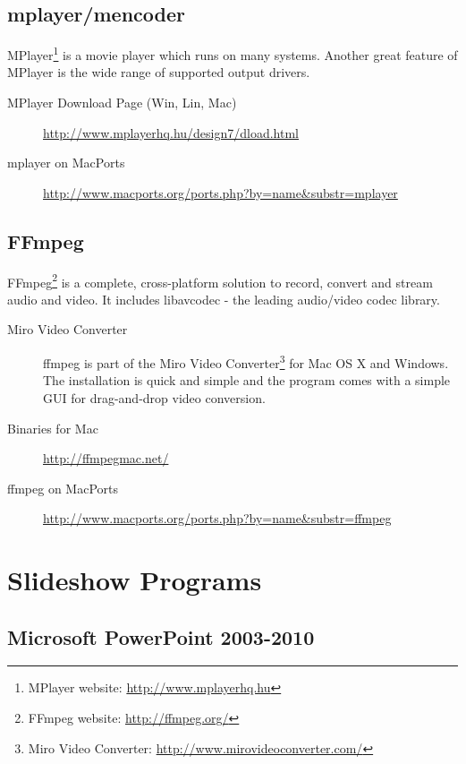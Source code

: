 \subsection{mplayer/mencoder}

MPlayer\footnote{MPlayer  website: \url{http://www.mplayerhq.hu}}  is  a movie
player which  runs on many  systems. Another great  feature of MPlayer  is the
wide range of supported output drivers.

\begin{description}
\item[MPlayer Download Page (Win, Lin, Mac)] \url{http://www.mplayerhq.hu/design7/dload.html}
\item[mplayer on MacPorts] \url{http://www.macports.org/ports.php?by=name&substr=mplayer}
\end{description}

\subsection{FFmpeg}

FFmpeg\footnote{FFmpeg  website:   \url{http://ffmpeg.org/}}  is  a  complete,
cross-platform solution  to record,  convert and stream  audio and  video.  It
includes libavcodec - the leading audio/video codec library.

\begin{description}
\item[Miro   Video   Converter]   ffmpeg   is   part   of   the   Miro   Video
Converter\footnote{Miro                    Video                    Converter:
\url{http://www.mirovideoconverter.com/}}  for  Mac  OS  X  and  Windows.  The
installation is quick  and simple and the program comes with  a simple GUI for
drag-and-drop video conversion.
\item[Binaries for Mac]\url{http://ffmpegmac.net/}
\item[ffmpeg on MacPorts] \url{http://www.macports.org/ports.php?by=name&substr=ffmpeg}
\end{description}

\section{Slideshow Programs}

\subsection{Microsoft PowerPoint 2003-2010}

